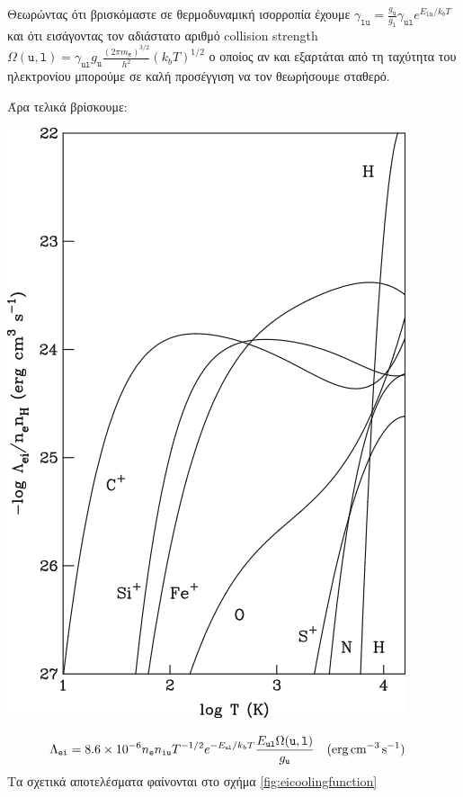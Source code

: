 Θεωρώντας ότι βρισκόμαστε σε θερμοδυναμική ισορροπία έχουμε 
$\gamma _\mathtt{lu} = \frac{g_\mathtt{u}}{g_\mathtt{l}}\gamma _\mathtt{ul}e^{E_\mathtt{lu}/k_b T}$ και ότι 
εισάγοντας τον αδιάστατο αριθμό collision strength $\Omega (\mathtt{u,l}) = \gamma _\mathtt{ul} g_\mathtt{u} \frac{(2\pi m_\mathtt{e})^{3/2}}{h^2} (k_bT)^{1/2}$ ο οποίος αν και εξαρτάται από τη ταχύτητα του ηλεκτρονίου μπορούμε σε καλή προσέγγιση να τον θεωρήσουμε σταθερό.

Άρα τελικά βρίσκουμε:
\begin{marginfigure}
	\centering
	\includegraphics[width=1\linewidth]{Images/eiCoolingFunction}
	\caption{}
	\label{fig:eicoolingfunction}
\end{marginfigure}

\begin{equation}
\Lambda _\mathtt{ei}=\num{8.6e-6} n_\mathtt{e} n_\mathtt{iu}T^{-1/2} e^{-E_\mathtt{ul}/k_b T}\frac{E_\mathtt{ul}\Omega (\mathtt{u,l})}{g_\mathtt{u}} \qq{(\si{erg.cm^{-3}.s^{-1}})} 
\end{equation}
Τα σχετικά αποτελέσματα φαίνονται στο σχήμα \ref{fig:eicoolingfunction}

